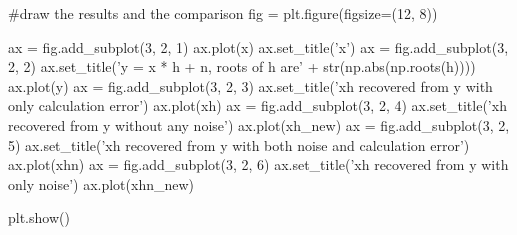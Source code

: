 \documentclass{article}
\begin{document}
\begin{appendices}
\begin{python}
#draw the results and the comparison
fig = plt.figure(figsize=(12, 8))

ax = fig.add_subplot(3, 2, 1)
ax.plot(x)
ax.set_title('x')
ax = fig.add_subplot(3, 2, 2)
ax.set_title('y = x * h + n, roots of h are' + str(np.abs(np.roots(h))))
ax.plot(y)
ax = fig.add_subplot(3, 2, 3)
ax.set_title('xh recovered from y with only calculation error')
ax.plot(xh)
ax = fig.add_subplot(3, 2, 4)
ax.set_title('xh recovered from y without any noise')
ax.plot(xh_new)
ax = fig.add_subplot(3, 2, 5)
ax.set_title('xh recovered from y with both noise and calculation error')
ax.plot(xhn)
ax = fig.add_subplot(3, 2, 6)
ax.set_title('xh recovered from y with only noise')
ax.plot(xhn_new)

plt.show()

\end{python}

\end{appendices}
\end{document}
